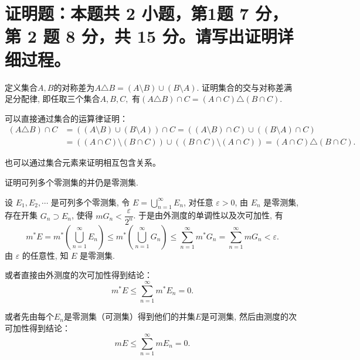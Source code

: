 \section{%
  证明题：本题共 2 小题，第1题 7 分，第 2 题 8 分，共 15 分。请写出证明详细过程。
}


\begin{question}[points = 7]
  定义集合$A, B$的对称差为$A \triangle B = (A \setminus B) \cup (B \setminus A).$ 证明集合的交与对称差满足分配律, 即任取三个集合$A, B, C,$ 有$(A \triangle B) \cap C = (A \cap C) \triangle (B \cap C).$
\end{question}

\begin{solution}
  可以直接通过集合的运算律证明：
  \[\begin{aligned}
  (A \triangle B) \cap C & = ((A \setminus B) \cup (B \setminus A)) \cap C = ((A \setminus B) \cap C) \cup ((B \setminus A) \cap C) \\
  & = ((A \cap C) \setminus (B \cap C)) \cup ((B \cap C) \setminus (A \cap C)) = (A \cap C) \triangle (B \cap C).
  \end{aligned}\]

  也可以通过集合元素来证明相互包含关系。
\end{solution}

\begin{question}[points = 8]
  证明可列多个零测集的并仍是零测集.
\end{question}

\begin{solution}
  设 \(E_1, E_2, \cdots\) 是可列多个零测集, 令 \(E = \bigcup\limits_{n=1}^{\infty} E_n\), 对任意 \(\varepsilon > 0\), 由 \(E_n\) 是零测集, 存在开集 \(G_n \supset E_n\), 使得 \(m G_n < \dfrac{\varepsilon}{2^n}\). 于是由外测度的单调性以及次可加性, 有
  \[m^* E = m^* \left( \bigcup\limits_{n=1}^{\infty} E_n \right) \leqslant m^* \left( \bigcup\limits_{n=1}^{\infty} G_n \right) \leqslant \sum\limits_{n=1}^{\infty} m^* G_n = \sum\limits_{n=1}^{\infty} m G_n < \varepsilon.\]
  由 \(\varepsilon\) 的任意性, 知 \(E\) 是零测集.

  或者直接由外测度的次可加性得到结论：
  \[m^* E \leqslant \sum\limits_{n=1}^{\infty} m^* E_n = 0.\]

  或者先由每个\(E_n\)是零测集（可测集）得到他们的并集\(E\)是可测集, 然后由测度的次可加性得到结论：
  \[m E \leqslant \sum\limits_{n=1}^{\infty} m E_n = 0.\]
\end{solution}


